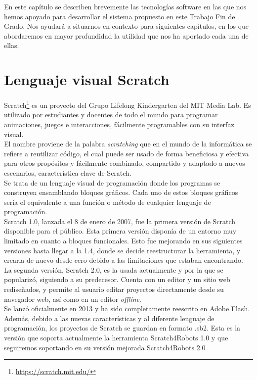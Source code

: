En este capítulo se describen brevemente las tecnologías
software en las que nos hemos apoyado para desarrollar el sistema propuesto
en este Trabajo Fin de Grado. Nos ayudará a situarnos en contexto para siguientes capítulos, en los que abordaremos en mayor profundidad la utilidad que nos ha aportado cada una de ellas.

\section{Lenguaje visual Scratch}
\label{sec:scratch}
Scratch\footnote{\url{https://scratch.mit.edu/}} es un proyecto del Grupo Lifelong Kindergarten del MIT Media Lab.
Es utilizado por estudiantes y docentes de todo el mundo para programar animaciones, juegos e interacciones, fácilmente programables con su interfaz visual.\\

El nombre proviene de la palabra \textit{scratching} que en el mundo de la informática se refiere a reutilizar código, el cual puede ser usado de forma beneficiosa y efectiva para otros propósitos y fácilmente combinado, compartido y adaptado a nuevos escenarios, característica clave de Scratch.\\

Se trata de un lenguaje visual de programación donde los programas se construyen ensamblando bloques gráficos. Cada uno de estos bloques gráficos sería el equivalente a una función o método de cualquier lenguaje de programación.\\

Scratch 1.0, lanzada el 8 de enero de 2007, fue la primera versión de Scratch disponible para el público. Esta primera versión disponía de un entorno muy limitado en cuanto a bloques funcionales. Esto fue mejorando en sus siguientes versiones hasta llegar a la 1.4, donde se decide reestructurar la herramienta, y crearla de nuevo desde cero debido a las limitaciones que estaban encontrando.\\

La segunda versión, Scratch 2.0, es la usada actualmente y por la que se popularizó, siguiendo a su predecesor. Cuenta con un editor y un sitio web rediseñados, y permite al usuario editar proyectos directamente desde su navegador web, así como en un editor \textit{offline}.\\

Se lanzó oficialmente en 2013 y ha sido completamente reescrito en Adobe Flash. Además, debido a las nuevas características y al diferente lenguaje de programación, los proyectos de Scratch se guardan en formato .sb2. Esta es la versión que soporta actualmente la herramienta Scratch4Robots 1.0 y que seguiremos soportando en su versión mejorada Scratch4Robots 2.0\\

